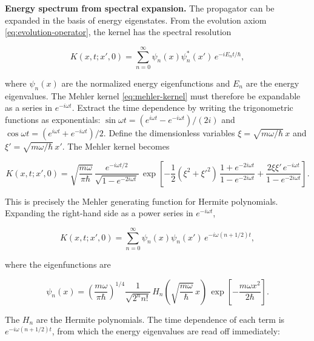 \medskip\noindent\textbf{Energy spectrum from spectral expansion.}
The propagator can be expanded in the basis of energy eigenstates. From the evolution axiom \eqref{eq:evolution-operator}, the kernel has the spectral resolution
\begin{linenomath}
\begin{equation}
K(x,t;x',0) = \sum_{n=0}^{\infty} \psi_n(x)\psi_n^*(x')\,e^{-iE_n t/\hbar},
\label{eq:mehler-spectral}
\end{equation}
\end{linenomath}
where $\psi_n(x)$ are the normalized energy eigenfunctions and $E_n$ are the energy eigenvalues. The Mehler kernel \eqref{eq:mehler-kernel} must therefore be expandable as a series in $e^{-i\omega t}$. Extract the time dependence by writing the trigonometric functions as exponentials: $\sin\omega t = (e^{i\omega t} - e^{-i\omega t})/(2i)$ and $\cos\omega t = (e^{i\omega t} + e^{-i\omega t})/2$. Define the dimensionless variables $\xi = \sqrt{m\omega/\hbar}\,x$ and $\xi' = \sqrt{m\omega/\hbar}\,x'$. The Mehler kernel becomes
\begin{linenomath}
\begin{equation}
K(x,t;x',0) = \sqrt{\frac{m\omega}{\pi\hbar}}\,
\frac{e^{-i\omega t/2}}{\sqrt{1 - e^{-2i\omega t}}}\,
\exp\!\left[-\frac{1}{2}(\xi^2 + \xi'^2)\,\frac{1 + e^{-2i\omega t}}{1 - e^{-2i\omega t}}
+ \frac{2\xi\xi'\,e^{-i\omega t}}{1 - e^{-2i\omega t}}\right].
\end{equation}
\end{linenomath}
This is precisely the Mehler generating function for Hermite polynomials. Expanding the right-hand side as a power series in $e^{-i\omega t}$,
\begin{linenomath}
\begin{equation}
K(x,t;x',0) = \sum_{n=0}^{\infty} \psi_n(x)\psi_n(x')\,
e^{-i\omega (n + 1/2)t},
\end{equation}
\end{linenomath}
where the eigenfunctions are
\begin{linenomath}
\begin{equation}
\psi_n(x) = \left(\frac{m\omega}{\pi\hbar}\right)^{1/4}
\frac{1}{\sqrt{2^n n!}}\,
H_n\!\left(\sqrt{\frac{m\omega}{\hbar}}\,x\right)\,
\exp\!\left[-\frac{m\omega x^2}{2\hbar}\right].
\end{equation}
\end{linenomath}
The $H_n$ are the Hermite polynomials. The time dependence of each term is $e^{-i\omega(n+1/2)t}$, from which the energy eigenvalues are read off immediately:
